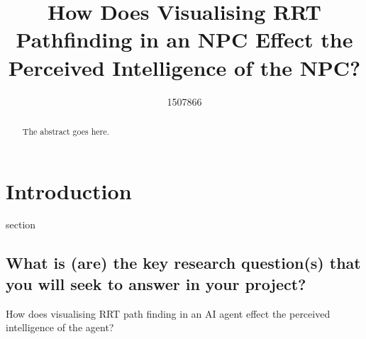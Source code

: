 \documentclass[journal]{IEEEtran}
\begin{document}
%
\title{ How Does Visualising RRT Pathfinding in an NPC Effect the Perceived Intelligence of the NPC?}
%
%
\author{1507866}


\maketitle

\begin{abstract}
The abstract goes here.
\end{abstract}

\section{Introduction}
% 
% 
% 
% 
 section 
\subsection{What is (are) the key research question(s) that you will seek to answer in	your project?}
How does visualising RRT path finding in an AI agent effect the perceived intelligence of the agent?
\end{document}
